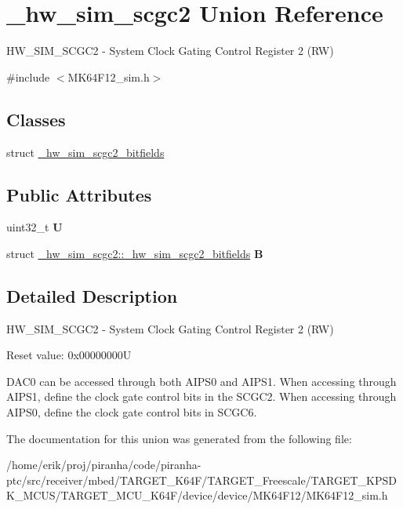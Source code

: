 \hypertarget{union__hw__sim__scgc2}{}\section{\+\_\+hw\+\_\+sim\+\_\+scgc2 Union Reference}
\label{union__hw__sim__scgc2}


H\+W\+\_\+\+S\+I\+M\+\_\+\+S\+C\+G\+C2 -\/ System Clock Gating Control Register 2 (RW)  




{\ttfamily \#include $<$M\+K64\+F12\+\_\+sim.\+h$>$}

\subsection*{Classes}
\begin{DoxyCompactItemize}
\item 
struct \hyperlink{struct__hw__sim__scgc2_1_1__hw__sim__scgc2__bitfields}{\+\_\+hw\+\_\+sim\+\_\+scgc2\+\_\+bitfields}
\end{DoxyCompactItemize}
\subsection*{Public Attributes}
\begin{DoxyCompactItemize}
\item 
uint32\+\_\+t {\bfseries U}\hypertarget{union__hw__sim__scgc2_a5e14811565887ff71bc9ecc84dc97be9}{}\label{union__hw__sim__scgc2_a5e14811565887ff71bc9ecc84dc97be9}

\item 
struct \hyperlink{struct__hw__sim__scgc2_1_1__hw__sim__scgc2__bitfields}{\+\_\+hw\+\_\+sim\+\_\+scgc2\+::\+\_\+hw\+\_\+sim\+\_\+scgc2\+\_\+bitfields} {\bfseries B}\hypertarget{union__hw__sim__scgc2_ae47d6abe66418e8ed4b221abe3f613d2}{}\label{union__hw__sim__scgc2_ae47d6abe66418e8ed4b221abe3f613d2}

\end{DoxyCompactItemize}


\subsection{Detailed Description}
H\+W\+\_\+\+S\+I\+M\+\_\+\+S\+C\+G\+C2 -\/ System Clock Gating Control Register 2 (RW) 

Reset value\+: 0x00000000U

D\+A\+C0 can be accessed through both A\+I\+P\+S0 and A\+I\+P\+S1. When accessing through A\+I\+P\+S1, define the clock gate control bits in the S\+C\+G\+C2. When accessing through A\+I\+P\+S0, define the clock gate control bits in S\+C\+G\+C6. 

The documentation for this union was generated from the following file\+:\begin{DoxyCompactItemize}
\item 
/home/erik/proj/piranha/code/piranha-\/ptc/src/receiver/mbed/\+T\+A\+R\+G\+E\+T\+\_\+\+K64\+F/\+T\+A\+R\+G\+E\+T\+\_\+\+Freescale/\+T\+A\+R\+G\+E\+T\+\_\+\+K\+P\+S\+D\+K\+\_\+\+M\+C\+U\+S/\+T\+A\+R\+G\+E\+T\+\_\+\+M\+C\+U\+\_\+\+K64\+F/device/device/\+M\+K64\+F12/M\+K64\+F12\+\_\+sim.\+h\end{DoxyCompactItemize}
